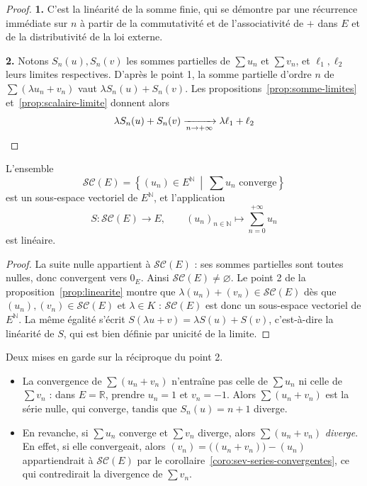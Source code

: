 \begin{proof}
\textbf{1.} C'est la linéarité de la somme finie, qui se démontre par une récurrence immédiate sur $n$ à partir de la commutativité et de l'associativité de $+$ dans $E$ et de la distributivité de la loi externe.

\textbf{2.} Notons $S_n(u),S_n(v)$ les sommes partielles de $\sum u_n$ et $\sum v_n$, et $\ell_1,\ell_2$ leurs limites respectives. D'après le point 1, la somme partielle d'ordre $n$ de $\sum(\lambda u_n+v_n)$ vaut $\lambda S_n(u)+S_n(v)$. Les propositions~\ref{prop:somme-limites} et~\ref{prop:scalaire-limite} donnent alors
\[\lambda S_n(u)+S_n(v)\xrightarrow[n\to+\infty]{}\lambda\ell_1+\ell_2\qedhere\]
\end{proof}

\begin{coro}
\label{coro:sev-series-convergentes}
L'ensemble
\[\mathcal{SC}(E)=\left\{(u_n)\in E^{\mathbb{N}}\ \middle|\ \sum u_n \text{ converge}\right\}\]
est un sous-espace vectoriel de $E^{\mathbb{N}}$, et l'application
\[S : \mathcal{SC}(E)\longrightarrow E,\qquad (u_n)_{n\in\mathbb{N}}\longmapsto \sum_{n=0}^{+\infty}u_n\]
est linéaire.
\end{coro}

\begin{proof}
La suite nulle appartient à $\mathcal{SC}(E)$ : ses sommes partielles sont toutes nulles, donc convergent vers $0_E$. Ainsi $\mathcal{SC}(E)\neq\varnothing$. Le point 2 de la proposition~\ref{prop:linearite} montre que $\lambda(u_n)+(v_n)\in\mathcal{SC}(E)$ dès que $(u_n),(v_n)\in\mathcal{SC}(E)$ et $\lambda\in K$ : $\mathcal{SC}(E)$ est donc un sous-espace vectoriel de $E^{\mathbb{N}}$. La même égalité s'écrit $S(\lambda u+v)=\lambda S(u)+S(v)$, c'est-à-dire la linéarité de $S$, qui est bien définie par unicité de la limite.
\end{proof}

\begin{remarque}
Deux mises en garde sur la réciproque du point 2.
\begin{itemize}
\item La convergence de $\sum(u_n+v_n)$ n'entraîne pas celle de $\sum u_n$ ni celle de $\sum v_n$ : dans $E=\mathbb{R}$, prendre $u_n=1$ et $v_n=-1$. Alors $\sum(u_n+v_n)$ est la série nulle, qui converge, tandis que $S_n(u)=n+1$ diverge.
\item En revanche, si $\sum u_n$ converge et $\sum v_n$ diverge, alors $\sum(u_n+v_n)$ \emph{diverge}. En effet, si elle convergeait, alors $(v_n)=\big((u_n+v_n)\big)-(u_n)$ appartiendrait à $\mathcal{SC}(E)$ par le corollaire~\ref{coro:sev-series-convergentes}, ce qui contredirait la divergence de $\sum v_n$.
\end{itemize}
\end{remarque}

